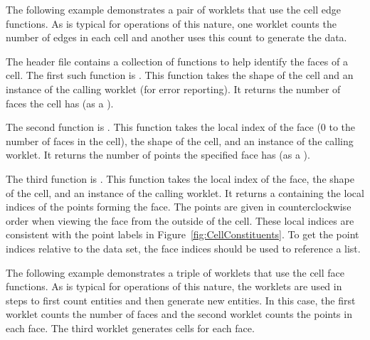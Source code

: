 The following example demonstrates a pair of worklets that use the cell edge functions.
As is typical for operations of this nature, one worklet counts the number of edges in each cell and another uses this count to generate the data.




The header file  contains a collection of functions to help identify the faces of a cell.
The first such function is .
This function takes the shape of the cell and an instance of the calling worklet (for error reporting).
It returns the number of faces the cell has (as a ).

The second function is .
This function takes the local index of the face (0 to the number of faces in the cell), the shape of the cell, and an instance of the calling worklet.
It returns the number of points the specified face has (as a ).

The third function is .
This function takes the local index of the face, the shape of the cell, and an instance of the calling worklet.
It returns a  containing the local indices of the points forming the face.
The points are given in counterclockwise order when viewing the face from the outside of the cell.
These local indices are consistent with the point labels in Figure~\ref{fig:CellConstituents}.
To get the point indices relative to the data set, the face indices should be used to reference a  list.

The following example demonstrates a triple of worklets that use the cell face functions.
As is typical for operations of this nature, the worklets are used in steps to first count entities and then generate new entities.
In this case, the first worklet counts the number of faces and the second worklet counts the points in each face.
The third worklet generates cells for each face.



